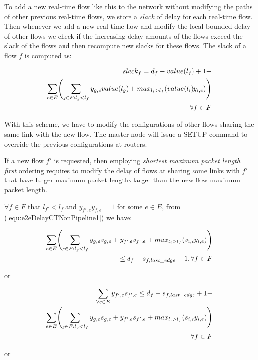 \documentclass[conference, twocolumn]{IEEEtran}
\theoremstyle{definition}
\begin{document}
To add a new real-time flow like this to the network without modifying the paths
of other previous real-time flows, we store a {\em slack} of delay for each
real-time flow. Then whenever we add a new real-time flow and modify the local
bounded delay of other flows we check if the increasing delay amounts of the
flows exceed the slack of the flows and then recompute new slacks for these
flows. The slack of a flow $f$ is computed as:

\begin{eqnarray}\label{equ:slack1}
	slack_f= d_f-value(l_f) + 1 - \notag \\
	\sum_{e \in E} \Biggl(\sum_{g \in F:l_g < l_f}y_{g,e}value(l_g)
	+max_{l_i>l_f}(value(l_i)y_{i,e})\Biggr) \notag \\ 
	\forall f \in F
\end{eqnarray}

With this scheme, we have to modify the configurations of other flows sharing
the same link with the new flow. The master node will issue a SETUP command to
override the previous configurations at routers.

If a new flow $f'$ is requested, then employing {\em shortest maximum packet
length first} ordering requires to modify the delay of flows at sharing some
links with $f'$ that have larger maximum packet lengths larger than the new flow
maximum packet length. 

$\forall f \in F$  that $l_{f'} < l_f$ and $y_{f',e}y_{f,e}=1 \mbox{ for some }
e \in E$, from (\ref{equ:e2eDelayCTNonPipeline1}) we have:

\begin{eqnarray}\label{equ:e2eDelayModification}
\sum_{e \in E} \Biggl(\sum_{g \in F:l_g <
l_f}y_{g,e}s_{g,e}+y_{f',e}s_{f',e}+max_{l_i>l_f}(s_{i,e}y_{i,e})\Biggr)\notag
\\ \leq d_f-s_{f, last\_edge} + 1, \forall f \in F
\end{eqnarray}

or

\begin{eqnarray}\label{equ:e2eDelayModificatio2}
\sum_{\forall e \in E}y_{f',e}s_{f',e} \leq d_f-s_{f,last\_edge} + 1 - \notag \\ 
\sum_{e \in E} \Biggl(\sum_{g \in F:l_g <
l_f}y_{g,e}s_{g,e}+y_{f',e}s_{f',e}+max_{l_i>l_f}(s_{i,e}y_{i,e})\Biggr) \notag
\\ \forall f \in F
\end{eqnarray}

or
\end{document}
